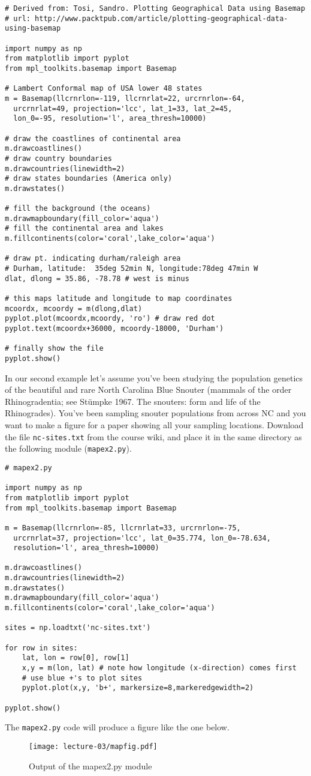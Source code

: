 \documentclass{article}
\makeatletter
\def\maxwidth{
    \ifdim\Gin@nat@width > 3.5in 
        3.5in
    \else\Gin@nat@width
    \fi}
\let\Oldincludegraphics\includegraphics
\renewcommand{\includegraphics}[1]{\Oldincludegraphics[width=\maxwidth]{#1}}
\makeatother
\begin{document}
\begin{lstlisting}
# Derived from: Tosi, Sandro. Plotting Geographical Data using Basemap
# url: http://www.packtpub.com/article/plotting-geographical-data-using-basemap

import numpy as np
from matplotlib import pyplot
from mpl_toolkits.basemap import Basemap

# Lambert Conformal map of USA lower 48 states
m = Basemap(llcrnrlon=-119, llcrnrlat=22, urcrnrlon=-64,
  urcrnrlat=49, projection='lcc', lat_1=33, lat_2=45,
  lon_0=-95, resolution='l', area_thresh=10000)

# draw the coastlines of continental area
m.drawcoastlines()
# draw country boundaries
m.drawcountries(linewidth=2)
# draw states boundaries (America only)
m.drawstates()

# fill the background (the oceans)
m.drawmapboundary(fill_color='aqua')
# fill the continental area and lakes
m.fillcontinents(color='coral',lake_color='aqua')

# draw pt. indicating durham/raleigh area
# Durham, latitude:  35deg 52min N, longitude:78deg 47min W
dlat, dlong = 35.86, -78.78 # west is minus

# this maps latitude and longitude to map coordinates
mcoordx, mcoordy = m(dlong,dlat)
pyplot.plot(mcoordx,mcoordy, 'ro') # draw red dot
pyplot.text(mcoordx+36000, mcoordy-18000, 'Durham')

# finally show the file
pyplot.show()    
\end{lstlisting}
In our second example let's assume you've been studying the population
genetics of the beautiful and rare North Carolina Blue Snouter (mammals
of the order Rhinogradentia; see Stümpke 1967. The snouters: form and
life of the Rhinogrades). You've been sampling snouter populations from
across NC and you want to make a figure for a paper showing all your
sampling locations. Download the file \lstinline!nc-sites.txt! from the
course wiki, and place it in the same directory as the following module
(\lstinline!mapex2.py!).

\begin{lstlisting}
# mapex2.py

import numpy as np
from matplotlib import pyplot
from mpl_toolkits.basemap import Basemap

m = Basemap(llcrnrlon=-85, llcrnrlat=33, urcrnrlon=-75,
  urcrnrlat=37, projection='lcc', lat_0=35.774, lon_0=-78.634,
  resolution='l', area_thresh=10000)

m.drawcoastlines()
m.drawcountries(linewidth=2)
m.drawstates()
m.drawmapboundary(fill_color='aqua')
m.fillcontinents(color='coral',lake_color='aqua')

sites = np.loadtxt('nc-sites.txt')

for row in sites:
    lat, lon = row[0], row[1]
    x,y = m(lon, lat) # note how longitude (x-direction) comes first
    # use blue +'s to plot sites
    pyplot.plot(x,y, 'b+', markersize=8,markeredgewidth=2) 

pyplot.show()    
\end{lstlisting}
The \lstinline!mapex2.py! code will produce a figure like the one below.

\begin{figure}[htbp]
\centering
\texttt{[image: lecture-03/mapfig.pdf]}
\caption{Output of the mapex2.py module}
\end{figure}
\end{document}
